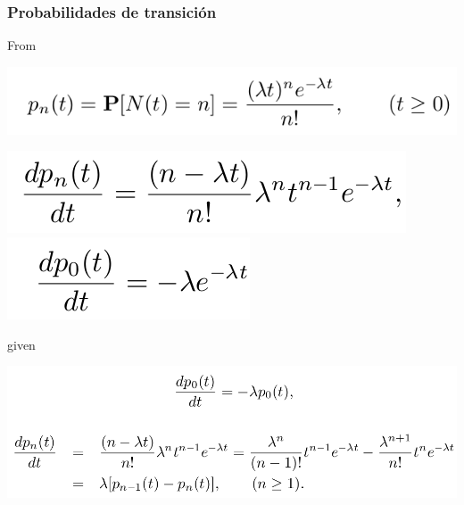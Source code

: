\documentclass[spanish]{beamer}
\begin{document}
\begin{frame}
\frametitle{Probabilidades de transición}
From
\begin{center}
\includegraphics[scale=0.28]{im1}
\end{center}

\begin{center}
\includegraphics[scale=0.28]{im5}
\includegraphics[scale=0.28]{im6}
\end{center}
given 
\begin{center}
\includegraphics[scale=0.32]{im11}
\end{center}

\end{frame}
\end{document}
